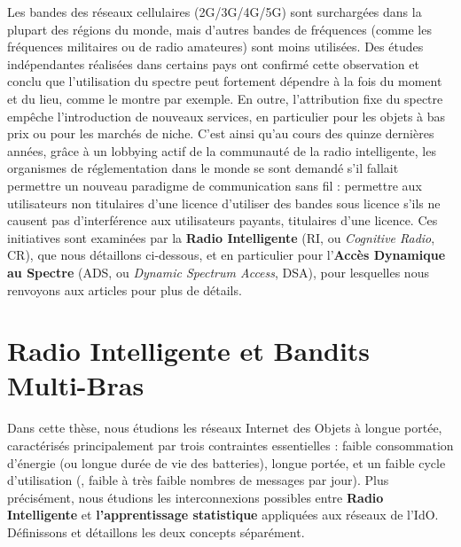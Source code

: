\begin{resume_fr}
Les bandes des réseaux cellulaires (2G/3G/4G/5G) sont surchargées dans la plupart des régions du monde, mais d'autres bandes de fréquences (comme les fréquences militaires ou de radio amateures) sont moins utilisées.
Des études indépendantes réalisées dans certains pays ont confirmé cette observation et conclu que l'utilisation du spectre peut fortement dépendre à la fois du moment et du lieu, comme le montre \cite{Lopez2009spectral} par exemple.
En outre, l'attribution fixe du spectre empêche
l'introduction de nouveaux services, en particulier pour les objets à bas prix ou pour les marchés de niche.
%
C'est ainsi qu'au cours des quinze dernières années, grâce à un lobbying actif de la communauté de la radio intelligente,
les organismes de réglementation dans le monde se sont demandé s'il fallait permettre un nouveau paradigme de communication sans fil :
permettre aux utilisateurs non titulaires d'une licence d'utiliser des bandes sous licence s'ils ne causent pas d'interférence aux utilisateurs payants, titulaires d'une licence.
Ces initiatives sont examinées par la \textbf{Radio Intelligente} (RI, ou \emph{Cognitive Radio}, CR),
que nous détaillons ci-dessous, et en particulier pour l'\textbf{Accès Dynamique au Spectre} (ADS, ou \emph{Dynamic Spectrum Access}, DSA),
pour lesquelles nous renvoyons aux articles \cite{akyildiz2006next,garhwal2012survey} pour plus de détails.



\section*{Radio Intelligente et Bandits Multi-Bras}

Dans cette thèse, nous étudions les réseaux Internet des Objets à longue portée, caractérisés principalement par trois contraintes essentielles :
faible consommation d'énergie (ou longue durée de vie des batteries),
longue portée,
et un faible cycle d'utilisation (\ie, faible à très faible nombres de messages par jour).
%
Plus précisément, nous étudions les interconnexions possibles entre \textbf{Radio Intelligente} et \textbf{l'apprentissage statistique} appliquées aux réseaux de l'IdO.
Définissons et détaillons les deux concepts séparément.



\end{resume_fr}
